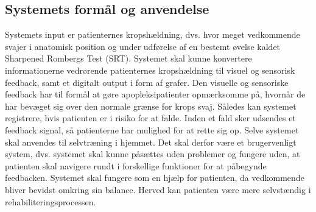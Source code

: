 \subsection{Systemets formål og anvendelse}
Systemets input er patienternes kropshældning, dvs. hvor meget vedkommende svajer i anatomisk position og under udførelse af en bestemt øvelse kaldet Sharpened Rombergs Test (SRT). Systemet skal kunne konvertere informationerne vedrørende patienternes kropshældning til visuel og sensorisk feedback, samt et digitalt output i form af grafer. Den visuelle og sensoriske feedback har til formål at gøre apopleksipatienter opmærksomme på, hvornår de har bevæget sig over den normale grænse for krops svaj. Således kan systemet registrere, hvis patienten er i risiko for at falde. Inden et fald sker udsendes et feedback signal, så patienterne har mulighed for at rette sig op. Selve systemet skal anvendes til selvtræning i hjemmet. Det skal derfor være et brugervenligt system, dvs. systemet skal kunne påsættes uden problemer og fungere uden, at patienten skal navigere rundt i forskellige funktioner for at påbegynde feedbacken. Systemet skal fungere som en hjælp for patienten, da vedkommende bliver bevidst omkring sin balance. Herved kan patienten være mere selvstændig i rehabiliteringsprocessen.


